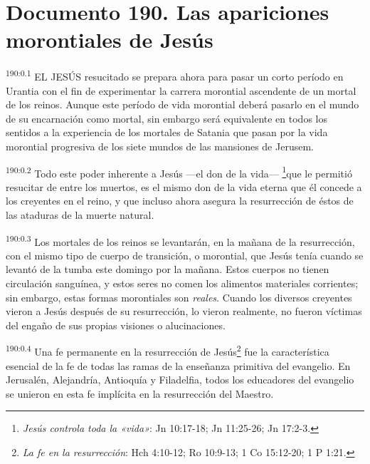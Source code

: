 \chapter{Documento 190. Las apariciones morontiales de Jesús}
\par
\textsuperscript{190:0.1} EL JESÚS resucitado se prepara ahora para pasar un corto período en Urantia con el fin de experimentar la carrera morontial ascendente de un mortal de los reinos. Aunque este período de vida morontial deberá pasarlo en el mundo de su encarnación como mortal, sin embargo será equivalente en todos los sentidos a la experiencia de los mortales de Satania que pasan por la vida morontial progresiva de los siete mundos de las mansiones de Jerusem.

\par
\textsuperscript{190:0.2} Todo este poder inherente a Jesús ---el don de la vida--- \footnote{\textit{Jesús controla toda la «vida»}: Jn 10:17-18; Jn 11:25-26; Jn 17:2-3.}que le permitió resucitar de entre los muertos, es el mismo don de la vida eterna que él concede a los creyentes en el reino, y que incluso ahora asegura la resurrección de éstos de las ataduras de la muerte natural.

\par
\textsuperscript{190:0.3} Los mortales de los reinos se levantarán, en la mañana de la resurrección, con el mismo tipo de cuerpo de transición, o morontial, que Jesús tenía cuando se levantó de la tumba este domingo por la mañana. Estos cuerpos no tienen circulación sanguínea, y estos seres no comen los alimentos materiales corrientes; sin embargo, estas formas morontiales son \textit{reales}. Cuando los diversos creyentes vieron a Jesús después de su resurrección, lo vieron realmente, no fueron víctimas del engaño de sus propias visiones o alucinaciones.

\par
\textsuperscript{190:0.4} Una fe permanente en la resurrección de Jesús\footnote{\textit{La fe en la resurrección}: Hch 4:10-12; Ro 10:9-13; 1 Co 15:12-20; 1 P 1:21.} fue la característica esencial de la fe de todas las ramas de la enseñanza primitiva del evangelio. En Jerusalén, Alejandría, Antioquía y Filadelfia, todos los educadores del evangelio se unieron en esta fe implícita en la resurrección del Maestro.

